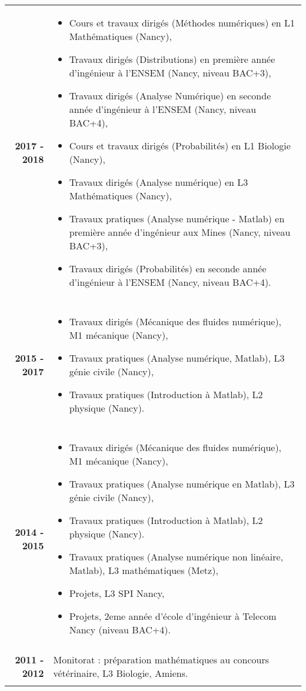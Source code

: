 \documentclass[10pt,a4paper]{report}
\begin{document}
\noindent
\begin{center}
\begin{tabular}{r p{12cm}}
\textbf{2017 - 2018} & \begin{itemize}
\item Cours et travaux dirigés (Méthodes numériques) en L1 Mathématiques (Nancy),
\item Travaux dirigés (Distributions) en première année d'ingénieur à l'ENSEM (Nancy, niveau BAC+3),
\item Travaux dirigés (Analyse Numérique) en seconde année d'ingénieur à l'ENSEM (Nancy, niveau BAC+4),
\item Cours et travaux dirigés (Probabilités) en L1 Biologie (Nancy),
\item Travaux dirigés (Analyse numérique) en L3 Mathématiques (Nancy),
\item Travaux pratiques (Analyse numérique - Matlab) en première année d'ingénieur aux Mines (Nancy, niveau BAC+3),
\item Travaux dirigés (Probabilités) en seconde année d'ingénieur à l'ENSEM (Nancy, niveau BAC+4).
\end{itemize}\\

& \\

\textbf{2015 - 2017} & \begin{itemize}
\item Travaux dirigés (Mécanique des fluides numérique), M1 mécanique (Nancy),
\item Travaux pratiques (Analyse numérique, Matlab), L3 génie civile (Nancy),
\item Travaux pratiques (Introduction à Matlab), L2 physique (Nancy).
\end{itemize}\\

& \\

\textbf{2014 - 2015} & \begin{itemize}
\item Travaux dirigés (Mécanique des fluides numérique), M1 mécanique (Nancy),
\item Travaux pratiques (Analyse numérique en Matlab), L3 génie civile (Nancy),
\item Travaux pratiques (Introduction à Matlab), L2 physique (Nancy).
\item Travaux pratiques (Analyse numérique non linéaire, Matlab), L3 mathématiques (Metz),
\item Projets, L3 SPI Nancy,
\item Projets, 2eme année d'école d'ingénieur à Telecom Nancy (niveau BAC+4).
\end{itemize}\\

& \\

\textbf{2011 - 2012} & Monitorat : préparation mathématiques au concours vétérinaire, L3 Biologie, Amiens.\\

& \\
\end{tabular}
\end{center}
\end{document}
